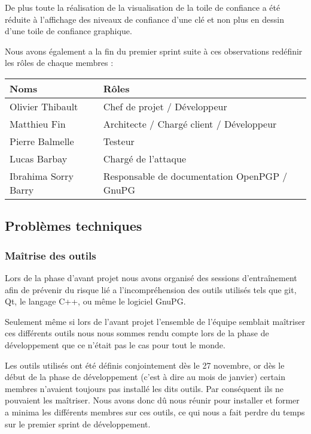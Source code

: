 \documentclass{../res/univ-projet}
\begin{document}
    De plus toute la réalisation de la visualisation de la toile de confiance a été réduite
    à l'affichage des niveaux de confiance d'une clé et non plus en dessin d'une toile de confiance graphique.

    Nous avons également a la fin du premier sprint suite à ces observations redéfinir les rôles de chaque membres : 

    \begin{tabular}{|l|l|}
      \hline
      \bfseries{Noms}      & \bfseries{Rôles}                             \\
      \hline
      Olivier Thibault     & Chef de projet / Développeur                 \\
      Matthieu Fin         & Architecte / Chargé client / Développeur     \\
      Pierre Balmelle      & Testeur                                      \\
      Lucas Barbay         & Chargé de l'attaque                          \\
      Ibrahima Sorry Barry & Responsable de documentation OpenPGP / GnuPG \\
      \hline

    \end{tabular}

    
  \subsection{Problèmes techniques}

    \subsubsection{Maîtrise des outils}

      Lors de la phase d'avant projet nous avons organisé des sessions d’entraînement afin
      de prévenir du risque lié a l’incompréhension des outils utilisés tels que git, Qt, le langage C++,
      ou même le logiciel GnuPG.

      Seulement même si lors de l'avant projet l'ensemble de l'équipe semblait maîtriser ces
      différents outils nous nous sommes rendu compte lors de la phase de développement que ce n'était pas le cas
      pour tout le monde.

      Les outils utilisés ont été définis conjointement dès le 27 novembre, or dès le début de la phase de développement
      (c'est à dire au mois de janvier) certain membres n'avaient toujours pas installé les dits outils. Par conséquent
      ils ne pouvaient les maîtriser. Nous avons donc dû nous réunir pour installer et former a minima les différents membres
      sur ces outils, ce qui nous a fait perdre du temps sur le premier sprint de développement.
\end{document}
